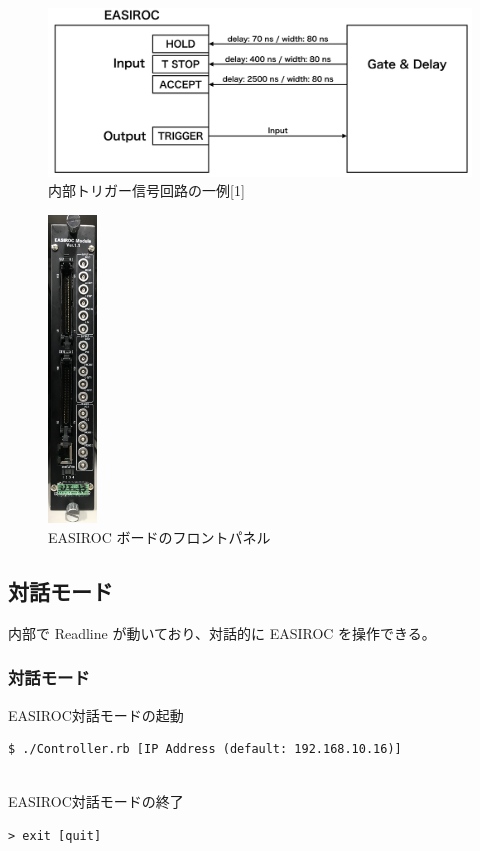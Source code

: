 \documentclass[a4paper]{report}
\begin{document}
\begin{figure}[H]
\begin{center}
\includegraphics[width = 13.0cm, bb= 0 0 899 358]{1.png}
\end{center}
\caption{内部トリガー信号回路の一例[1]}
\label{fig:}
\end{figure}

\begin{figure}[H]
\begin{center}
\includegraphics[width = 1.3cm, bb= 0 0 588 3683]{4.jpg}
\end{center}
\caption{EASIROC ボードのフロントパネル}
\label{fig:}
\end{figure}

\newpage
\subsection{対話モード}
内部で Readline が動いており、対話的に EASIROC を操作できる。
\subsubsection{対話モード}
EASIROC対話モードの起動
\begin{shadebox}
\begin{verbatim}
$ ./Controller.rb [IP Address (default: 192.168.10.16)]
\end{verbatim}
\end{shadebox}
　\\
EASIROC対話モードの終了
\begin{shadebox}
\begin{verbatim}
> exit [quit]
\end{verbatim}
\end{shadebox}
\end{document}
